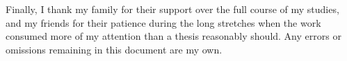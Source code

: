 Finally, I thank my family for their support over the full course of my studies, and my friends for their patience during the long stretches when the work consumed more of my attention than a thesis reasonably should. Any errors or omissions remaining in this document are my own.

\noindent
{}
\makebox[\textwidth]{\hfill\makebox[3in]{\hfill\graddate\hfill}}
